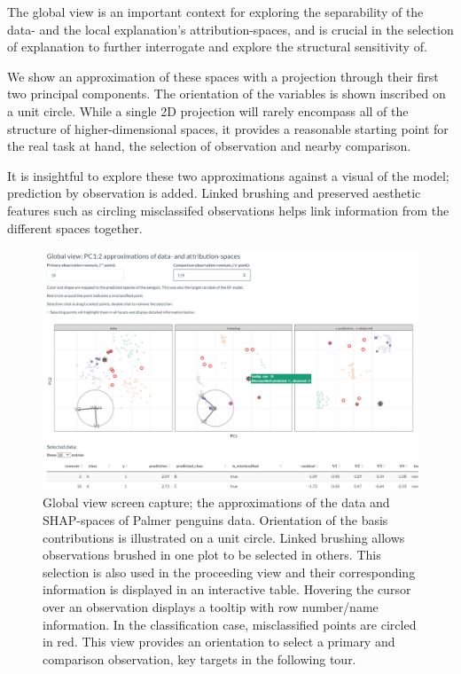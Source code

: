 \documentclass[
]{article}
\begin{document}
The global view is an important context for exploring the separability of the data- and the local explanation's attribution-spaces, and is crucial in the selection of explanation to further interrogate and explore the structural sensitivity of.

We show an approximation of these spaces with a projection through their first two principal components. The orientation of the variables is shown inscribed on a unit circle. While a single 2D projection will rarely encompass all of the structure of higher-dimensional spaces, it provides a reasonable starting point for the real task at hand, the selection of observation and nearby comparison.

It is insightful to explore these two approximations against a visual of the model; prediction by observation is added. Linked brushing and preserved aesthetic features such as circling misclassifed observations helps link information from the different spaces together.

\begin{figure}

{\centering \includegraphics[width=1\linewidth]{./figures/global_view_toy_class} 

}

\caption{Global view screen capture; the approximations of the data and SHAP-spaces of Palmer penguins data. Orientation of the basis contributions is illustrated on a unit circle. Linked brushing allows observations brushed in one plot to be selected in others. This selection is also used in the proceeding view and their corresponding information is displayed in an interactive table. Hovering the cursor over an observation displays a tooltip with row number/name information. In the classification case, misclassified points are circled in red. This view provides an orientation to select a primary and comparison observation, key targets in the following tour.}\label{fig:globalview}
\end{figure}
\end{document}
